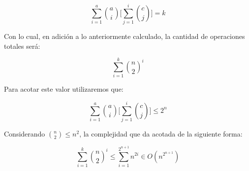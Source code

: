 \[
\sum_{i=1}^{a}\binom{a}{i}\bigg[\sum_{j=1}^{i}\binom{c}{j}\bigg]=k
\]  

Con lo cual, en adición a lo anteriormente calculado, la cantidad de operaciones totales será:

 \[
 \sum_{i=1}^{k}\binom{n}{2}^i
 \]

Para acotar este valor utilizaremos que:

\[
\sum_{i=1}^{a}\binom{a}{i}\bigg[\sum_{j=1}^{i}\binom{c}{j}\bigg]\leq 2^{n}
\]

Considerando $\binom{n}{2} \leq n^2$, la complejidad que da acotada de la siguiente forma:

 \[
 \sum_{i=1}^{k}\binom{n}{2}^i \leq \sum_{i=1}^{2^{n+1}}n^{2i} \in O(n^{2^{n+1}})
 \]





